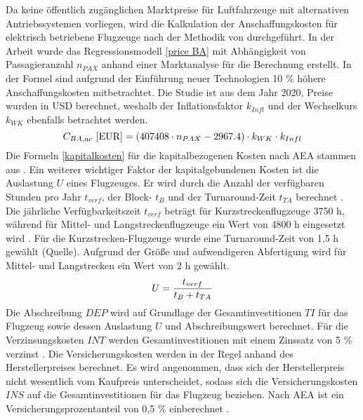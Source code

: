 Da keine öffentlich zugänglichen Marktpreise für Luftfahrzeuge mit alternativen Antriebssystemen vorliegen, 
wird die Kalkulation der Anschaffungskosten für elektrisch betriebene Flugzeuge 
nach der Methodik von \cite{monjon2020conceptual} durchgeführt. 
In der Arbeit wurde das Regressionsmodell \eqref{price BA} mit Abhängigkeit von Passagieranzahl $n_{PAX}$ 
anhand einer Marktanalyse für die Berechnung erstellt. 
%
In der Formel sind aufgrund der Einführung neuer Technologien 10 \% höhere Anschaffungskosten mitbetrachtet. 
Die Studie ist aus dem Jahr 2020, Preise wurden in USD berechnet, 
weshalb der Inflationsfaktor $k_{Infl}$ und der Wechselkurs $k_{WK}$ 
ebenfalls betrachtet werden.
%
\begin{equation}
   {C_{BA,ac} ~[\text{EUR}]} = (407408 \cdot n_{PAX} - 2967.4) \cdot k_{WK} \cdot {k_{Infl}}\\
   \label{price BA}
\end{equation}
%
Die Formeln \eqref{kapitalkosten} für die kapitalbezogenen Kosten nach AEA stammen aus \cite{minwoo2019analysis}.
Ein weiterer wichtiger Faktor der kapitalgebundenen Kosten ist die Auslastung $U$ eines Flugzeuges. 
Er wird durch die Anzahl der verfügbaren Stunden pro Jahr $t_{verf}$, 
der Block- $t_B$ und der Turnaround-Zeit $t_{TA}$ berechnet \cite{minwoo2019analysis}. 
Die jährliche Verfügbarkeitszeit $t_{verf}$ beträgt für Kurzstreckenflugzeuge 3750 h, 
während für Mittel- und Langstreckenflugzeuge ein Wert von 4800 h eingesetzt wird \cite{scholz_design_evaluation_doc}. 
Für die Kurzstrecken-Flugzeuge wurde eine Turnaround-Zeit von 1,5 h gewählt (Quelle).
Aufgrund der Größe und aufwendigeren Abfertigung wird für Mittel- und Langstrecken ein Wert von 2 h gewählt.
%
\begin{equation}
   U = \frac{t_{verf}}{t_B + t_{TA}} \\
   \label{utilisation}
\end{equation}
%
Die Abschreibung $DEP$ wird auf Grundlage der Gesamtinvestitionen $TI$ für das Flugzeug sowie dessen Auslastung $U$
und Abschreibungswert berechnet. Für die Verzinsungskosten $INT$ werden 
Gesamtinvestitionen mit einem Zinssatz von 5 \% verzinst \cite{scholz_design_evaluation_doc}.
Die Versicherungskosten werden in der Regel anhand des Herstellerpreises berechnet.
Es wird angenommen, dass sich der Herstellerpreis nicht wesentlich vom Kaufpreis unterscheidet, 
sodass sich die Versicherungskosten $INS$ auf die Gesamtinvestitionen für das Flugzeug beziehen. 
Nach AEA ist ein Versicherungsprozentanteil von 0,5 \% einberechnet \cite{scholz_design_evaluation_doc}.
